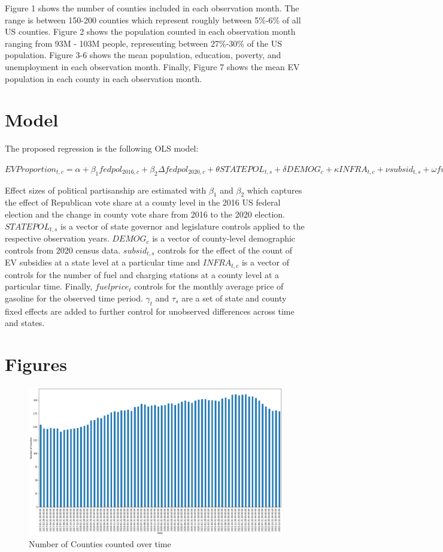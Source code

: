 \documentclass{article}
\begin{document}
Figure 1 shows the number of counties included in each observation month. The range is between 150-200 counties which represent roughly between 5\%-6\% of all US counties. Figure 2 shows the population counted in each observation month ranging from 93M - 103M people, representing between 27\%-30\% of the US population. Figure 3-6 shows the mean population, education, poverty, and unemployment in each observation month. Finally, Figure 7 shows the mean EV population in each county in each observation month.

\section{Model}

The proposed regression is the following OLS model:


${EV Proportion_{t,c}} = \alpha + \beta_{1} fed pol_{2016,c} + \beta_{2} \Delta fed pol_{2020,c} +\theta STATE POL_{t,s} +\delta  DEMOG_{c} + \kappa  INFRA_{t,c} + \nu  subsid_{t,s} + \omega fuelprice_{t} + \gamma_{t} + \tau_{s} +\epsilon$


Effect sizes of political partisanship are estimated with $\beta_{1}$ and $\beta_{2}$ which captures the effect of Republican vote share at a county level in the 2016 US federal election and the change in county vote share from 2016 to the 2020 election. $STATEPOL_{t,s}$ is a vector of state governor and legislature controls applied to the respective observation years. $DEMOG_{c}$ is a vector of county-level demographic controls from 2020 census data. $subsid_{t,s}$ controls for the effect of the count of EV subsidies at a state level at a particular time and $INFRA_{t,c}$ is a vector of controls for the number of fuel and charging stations at a county level at a particular time. Finally, $fuelprice_{t}$ controls for the monthly average price of gasoline for the observed time period. $\gamma_{t}$ and $\tau_{s}$ are a set of state and county fixed effects are added to further control for unobserved differences across time and states.

\newpage

\section{Figures}

\begin{figure}[!htb]
  \includegraphics[width=\linewidth]{ncounties}
  \caption{Number of Counties counted over time}
\end{figure}
\end{document}
